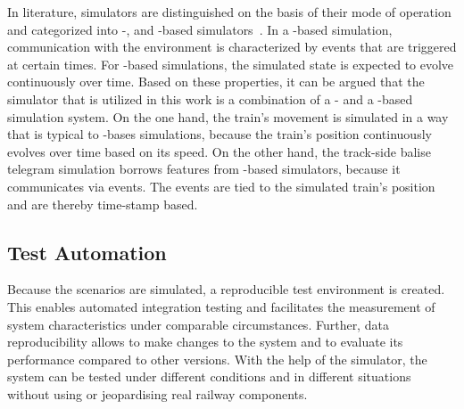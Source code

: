 In literature, simulators are distinguished on the basis of their mode of operation and categorized into -, and -based simulators~\cite{CoSimulationStateOfTheArt}.
In a -based simulation, communication with the environment is characterized by events that are triggered at certain times.
For -based simulations, the simulated state is expected to evolve continuously over time.
Based on these properties, it can be argued that the simulator that is utilized in this work is a combination of a - and a -based simulation system.
On the one hand, the train's movement is simulated in a way that is typical to -bases simulations, because the train's position continuously evolves over time based on its speed.
On the other hand, the track-side balise telegram simulation borrows features from -based simulators, because it communicates via events.
The events are tied to the simulated train's position and are thereby time-stamp based.


\subsection{Test Automation}
\label{subsec:testautomation}

Because the scenarios are simulated, a reproducible test environment is created.
This enables automated integration testing and facilitates the measurement of system characteristics under comparable circumstances.
Further, data reproducibility allows to make changes to the system and to evaluate its performance compared to other versions.
With the help of the simulator, the system can be tested under different conditions and in different situations without using or jeopardising real railway components.
\\

